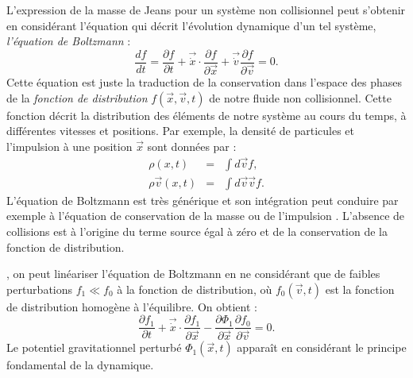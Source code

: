 L'expression de la masse de Jeans pour un système non collisionnel peut s'obtenir en considérant l'équation qui décrit l'évolution dynamique d'un tel système, \textit{l'équation de Boltzmann} :
\begin{equation}
\frac{d f}{dt}=\frac{\partial f}{\partial t}+\vec{\dot x}\cdot\frac{\partial f}{\partial \vec{x}}+\vec{\dot v}\frac{\partial f}{\partial \vec{v}}=0.
\end{equation}
Cette équation est juste la traduction de la conservation dans l'espace des phases de la \textit{fonction de distribution} $f(\vec{x},\vec{v},t)$ de notre fluide non collisionnel. Cette fonction décrit la distribution des éléments de notre système au cours du temps, à différentes vitesses et positions. Par exemple, la densité de particules  et l'impulsion à une position $\vec{x}$ sont données par :
\begin{eqnarray}
\rho(x,t)&=&\int d\vec{v} f,\\
\rho \vec{v}(x,t)&=&\int d\vec{v}\vec{v} f.
\end{eqnarray}
L'équation de Boltzmann est très générique et son intégration peut conduire par exemple à l'équation de conservation de la masse ou de l'impulsion . L'absence de collisions est à l'origine du terme source égal à zéro et de la conservation de la fonction de distribution.

, on peut linéariser l'équation de Boltzmann en ne considérant que de faibles perturbations $f_1\ll f_0$ à la fonction de distribution, où $f_0(\vec{v},t)$ est la fonction de distribution homogène à l'équilibre. On obtient :
\begin{equation}
\frac{\partial f_1}{\partial t}+\vec{\dot x}\cdot\frac{\partial f_1}{\partial \vec{x}}-\frac{\partial \Phi_1}{\partial \vec{x}}\frac{\partial f_0}{\partial \vec{v}}=0.
\end{equation}
Le potentiel gravitationnel perturbé $\Phi_1(\vec{x},t)$ apparaît en considérant le principe fondamental de la dynamique.

